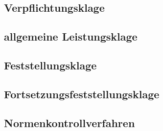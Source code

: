 \documentclass{article}
\begin{document}
\subsection{Verpflichtungsklage}
\subsection{allgemeine Leistungsklage}
\subsection{Feststellungsklage}
\subsection{Fortsetzungsfeststellungsklage}
\subsection{Normenkontrollverfahren}
\end{document}
